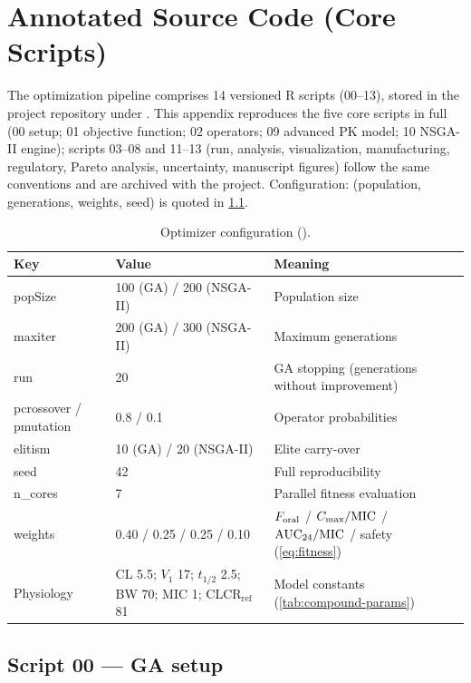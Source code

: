 \chapter{Annotated Source Code (Core Scripts)}
\label{chap:app-code}

The optimization pipeline comprises 14 versioned R scripts (00--13), stored in the project repository under   . This appendix reproduces the five core scripts in full (00 setup; 01 objective function; 02 operators; 09 advanced PK model; 10 NSGA-II engine); scripts 03--08 and 11--13 (run, analysis, visualization, manufacturing, regulatory, Pareto analysis, uncertainty, manuscript figures) follow the same conventions and are archived with the project. Configuration:  (population, generations, weights, seed) is quoted in \cref{tab:ga-config}.

\begin{table}[htbp]
\centering
\caption{Optimizer configuration ().}
\label{tab:ga-config}
\small
\small
\begin{tabular}{p{3.6cm}p{3.4cm}p{6.4cm}}
\toprule
Key & Value & Meaning\\
\midrule
popSize & 100 (GA) / 200 (NSGA-II) & Population size\\
maxiter & 200 (GA) / 300 (NSGA-II) & Maximum generations\\
run & 20 & GA stopping (generations without improvement)\\
pcrossover / pmutation & 0.8 / 0.1 & Operator probabilities\\
elitism & 10 (GA) / 20 (NSGA-II) & Elite carry-over\\
seed & 42 & Full reproducibility\\
n\_cores & 7 & Parallel fitness evaluation\\
weights & 0.40 / 0.25 / 0.25 / 0.10 & $F_{\mathrm{oral}}$ / $C_{\max}/\mathrm{MIC}$ / $\mathrm{AUC}_{24}/\mathrm{MIC}$ / safety (\cref{eq:fitness})\\
Physiology & CL 5.5; $V_1$ 17; $t_{1/2}$ 2.5; BW 70; MIC 1; CLCR$_{\mathrm{ref}}$ 81 & Model constants (\cref{tab:compound-params})\\
\bottomrule
\end{tabular}
\end{table}

\section{Script 00 --- GA setup}


